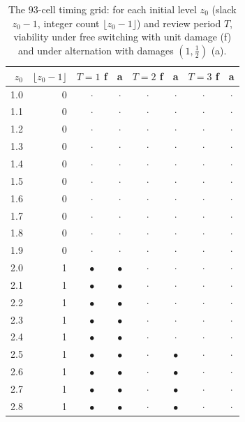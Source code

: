 \documentclass[11pt,a4paper]{article}
\theoremstyle{plain}
\theoremstyle{definition}
\theoremstyle{remark}
\begin{document}
\begin{table}[H]
\centering\footnotesize
\caption{The $93$-cell timing grid: for each initial level $z_0$ (slack $z_0-1$, integer count $\lfloor z_0-1\rfloor$) and review period $T$, viability under free switching with unit damage (f) and under alternation with damages $(1,\tfrac12)$ (a).}
\label{tab:timing}
\begin{tabular}{rrcccccc}
\toprule
$z_0$ & $\lfloor z_0-1\rfloor$ & $T{=}1$ f & a & $T{=}2$ f & a & $T{=}3$ f & a \\
\midrule
1.0 & 0 & $\cdot$ & $\cdot$ & $\cdot$ & $\cdot$ & $\cdot$ & $\cdot$ \\
1.1 & 0 & $\cdot$ & $\cdot$ & $\cdot$ & $\cdot$ & $\cdot$ & $\cdot$ \\
1.2 & 0 & $\cdot$ & $\cdot$ & $\cdot$ & $\cdot$ & $\cdot$ & $\cdot$ \\
1.3 & 0 & $\cdot$ & $\cdot$ & $\cdot$ & $\cdot$ & $\cdot$ & $\cdot$ \\
1.4 & 0 & $\cdot$ & $\cdot$ & $\cdot$ & $\cdot$ & $\cdot$ & $\cdot$ \\
1.5 & 0 & $\cdot$ & $\cdot$ & $\cdot$ & $\cdot$ & $\cdot$ & $\cdot$ \\
1.6 & 0 & $\cdot$ & $\cdot$ & $\cdot$ & $\cdot$ & $\cdot$ & $\cdot$ \\
1.7 & 0 & $\cdot$ & $\cdot$ & $\cdot$ & $\cdot$ & $\cdot$ & $\cdot$ \\
1.8 & 0 & $\cdot$ & $\cdot$ & $\cdot$ & $\cdot$ & $\cdot$ & $\cdot$ \\
1.9 & 0 & $\cdot$ & $\cdot$ & $\cdot$ & $\cdot$ & $\cdot$ & $\cdot$ \\
2.0 & 1 & $\bullet$ & $\bullet$ & $\cdot$ & $\cdot$ & $\cdot$ & $\cdot$ \\
2.1 & 1 & $\bullet$ & $\bullet$ & $\cdot$ & $\cdot$ & $\cdot$ & $\cdot$ \\
2.2 & 1 & $\bullet$ & $\bullet$ & $\cdot$ & $\cdot$ & $\cdot$ & $\cdot$ \\
2.3 & 1 & $\bullet$ & $\bullet$ & $\cdot$ & $\cdot$ & $\cdot$ & $\cdot$ \\
2.4 & 1 & $\bullet$ & $\bullet$ & $\cdot$ & $\cdot$ & $\cdot$ & $\cdot$ \\
2.5 & 1 & $\bullet$ & $\bullet$ & $\cdot$ & $\bullet$ & $\cdot$ & $\cdot$ \\
2.6 & 1 & $\bullet$ & $\bullet$ & $\cdot$ & $\bullet$ & $\cdot$ & $\cdot$ \\
2.7 & 1 & $\bullet$ & $\bullet$ & $\cdot$ & $\bullet$ & $\cdot$ & $\cdot$ \\
2.8 & 1 & $\bullet$ & $\bullet$ & $\cdot$ & $\bullet$ & $\cdot$ & $\cdot$ \\

\end{tabular}
\end{table}
\end{document}

